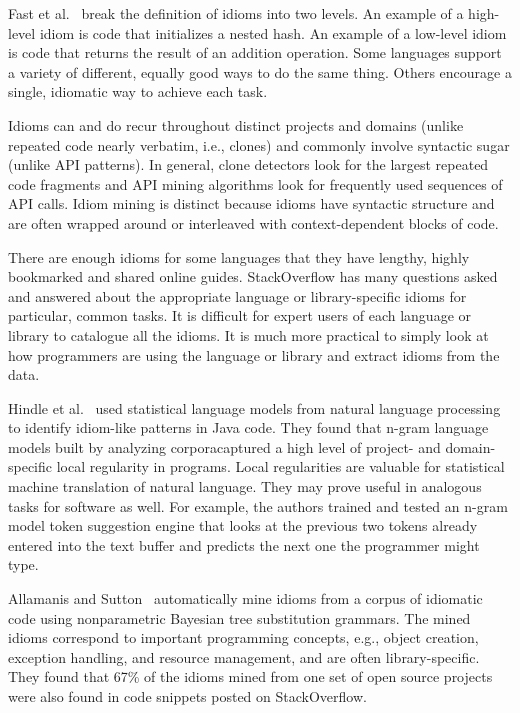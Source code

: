 
Fast et al.~\cite{codex} break the definition of idioms into two levels. An example of a high-level idiom is code that initializes a nested hash. An example of a low-level idiom is code that returns the result of an addition operation. Some languages support a variety of different, equally good ways to do the same thing. Others encourage a single, idiomatic way to achieve each task.

Idioms can and do recur throughout distinct projects and domains (unlike repeated code nearly verbatim, i.e., clones) and commonly involve syntactic sugar (unlike API patterns). In general, clone detectors look for the largest repeated code fragments and API mining algorithms look for frequently used sequences of API calls. Idiom mining is distinct because idioms have syntactic structure and are often wrapped around or interleaved with context-dependent blocks of code.%

There are enough idioms for some languages that they have lengthy, highly bookmarked and shared online guides. StackOverflow has many questions asked and answered about the appropriate language or library-specific idioms for particular, common tasks. It is difficult for expert users of each language or library to catalogue all the idioms. It is much more practical to simply look at how programmers are using the language or library and extract idioms from the data.

Hindle et al.~\cite{Hindle2012} used statistical language models from natural language processing to identify idiom-like patterns in Java code. They found that n-gram language models built by analyzing corporacaptured a high level of project- and domain-specific local regularity in programs. Local regularities are valuable for statistical machine translation of natural language. They may prove useful in analogous tasks for software as well. For example, the authors trained and tested an n-gram model token suggestion engine that looks at the previous two tokens already entered into the text buffer and predicts the next one the programmer might type.

Allamanis and Sutton~\cite{allamanis2014mining} automatically mine idioms from a corpus of idiomatic code using nonparametric Bayesian tree substitution grammars. The mined idioms correspond to important programming concepts, e.g., object creation, exception handling, and resource management, and are often library-specific. They found that 67\% of the idioms mined from one set of open source projects were also found in code snippets posted on StackOverflow.

